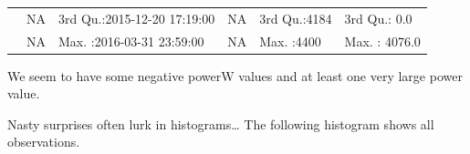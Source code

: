 \documentclass[]{article}
\begin{document}
\begin{longtable}[]{@{}llllll@{}}
\begin{minipage}[t]{0.03\columnwidth}\raggedright\strut
\strut
\end{minipage} & \begin{minipage}[t]{0.15\columnwidth}\raggedright\strut
NA\strut
\end{minipage} & \begin{minipage}[t]{0.24\columnwidth}\raggedright\strut
3rd Qu.:2015-12-20 17:19:00\strut
\end{minipage} & \begin{minipage}[t]{0.15\columnwidth}\raggedright\strut
NA\strut
\end{minipage} & \begin{minipage}[t]{0.12\columnwidth}\raggedright\strut
3rd Qu.:4184\strut
\end{minipage} & \begin{minipage}[t]{0.14\columnwidth}\raggedright\strut
3rd Qu.: 0.0\strut
\end{minipage}\tabularnewline
\begin{minipage}[t]{0.03\columnwidth}\raggedright\strut
\strut
\end{minipage} & \begin{minipage}[t]{0.15\columnwidth}\raggedright\strut
NA\strut
\end{minipage} & \begin{minipage}[t]{0.24\columnwidth}\raggedright\strut
Max. :2016-03-31 23:59:00\strut
\end{minipage} & \begin{minipage}[t]{0.15\columnwidth}\raggedright\strut
NA\strut
\end{minipage} & \begin{minipage}[t]{0.12\columnwidth}\raggedright\strut
Max. :4400\strut
\end{minipage} & \begin{minipage}[t]{0.14\columnwidth}\raggedright\strut
Max. : 4076.0\strut
\end{minipage}\tabularnewline
\bottomrule
\end{longtable}

We seem to have some negative powerW values and at least one very large
power value.

Nasty surprises often lurk in histograms\ldots{} The following histogram
shows all observations.
\end{document}
